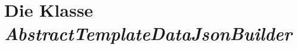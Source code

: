 \chapter{Die Klasse \emph{AbstractTemplateDataJsonBuilder}}
\label{app:quelltexte_abstract_template_json_builder}
\begin{footnotesize}

\end{footnotesize}